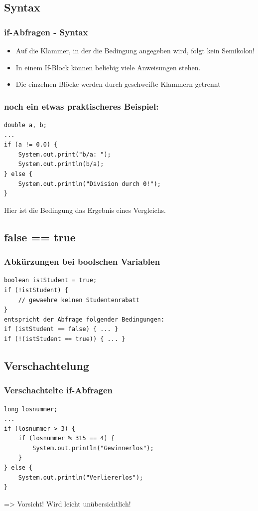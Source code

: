 \documentclass[final]{beamer}
\begin{document}
\subsection{Syntax}
\begin{frame}
	\frametitle{if-Abfragen - Syntax}
	\begin{itemize}
		\item{Auf die Klammer, in der die Bedingung angegeben wird, folgt kein Semikolon!}
		\item{In einem If-Block können beliebig viele Anweisungen stehen.}
		\item{Die einzelnen Blöcke werden durch geschweifte Klammern getrennt}
	\end{itemize}
\end{frame}

\begin{frame}[containsverbatim]
	\frametitle{noch ein etwas praktischeres Beispiel:}
	\begin{lstlisting}
double a, b;
...
if (a != 0.0) {
	System.out.print("b/a: ");
	System.out.println(b/a);
} else {
	System.out.println("Division durch 0!");
}
	\end{lstlisting}	
	Hier ist die Bedingung das Ergebnis eines Vergleichs.	
\end{frame}

\subsection{false == true}
\begin{frame}[containsverbatim]
	\frametitle{Abkürzungen bei boolschen Variablen}
	\begin{lstlisting}
boolean istStudent = true;
if (!istStudent) {
	// gewaehre keinen Studentenrabatt
}
entspricht der Abfrage folgender Bedingungen:
if (istStudent == false) { ... }
if (!(istStudent == true)) { ... }

	\end{lstlisting}
\end{frame}

\subsection{Verschachtelung}
\begin{frame}[containsverbatim]
	\frametitle{Verschachtelte if-Abfragen}
	\begin{lstlisting}
long losnummer;
...
if (losnummer > 3) {
	if (losnummer % 315 == 4) {
		System.out.println("Gewinnerlos");
	}
} else {
	System.out.println("Verliererlos");
}
	\end{lstlisting}
	=> Vorsicht! Wird leicht unübersichtlich!
\end{frame}
\end{document}
